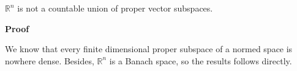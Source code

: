 \documentclass[12pt]{article}
\begin{document}
$\mathbb{R}^n$ is not a countable union of proper vector subspaces.

\textbf{Proof}

We know that every finite dimensional proper subspace of a normed space is nowhere dense. Besides, $\mathbb{R}^n$ is a Banach space, so the results follows directly.
\end{document}
